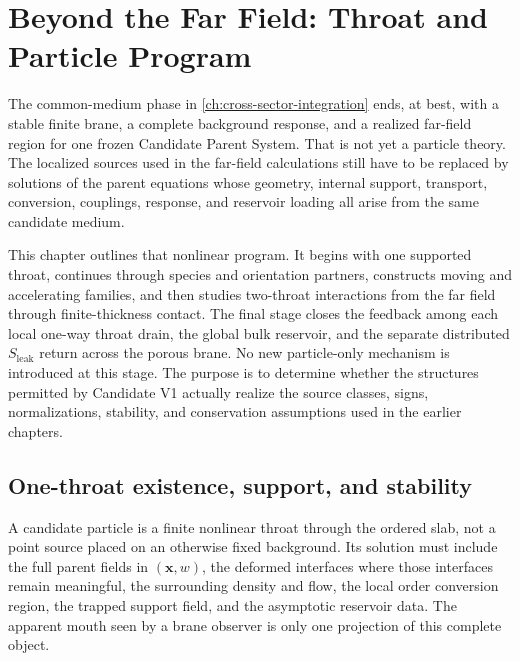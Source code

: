 
\chapter{Beyond the Far Field: Throat and Particle Program}
\label{ch:throat-particle-program}

The common-medium phase in \cref{ch:cross-sector-integration} ends, at best,
with a stable finite brane, a complete background response, and a realized
far-field region for one frozen Candidate Parent System. That is not yet a
particle theory. The localized sources used in the far-field calculations still
have to be replaced by solutions of the parent equations whose geometry,
internal support, transport, conversion, couplings, response, and reservoir
loading all arise from the same candidate medium.

This chapter outlines that nonlinear program. It begins with one supported
throat, continues through species and orientation partners, constructs moving
and accelerating families, and then studies two-throat interactions from the
far field through finite-thickness contact. The final stage closes the feedback
among each local one-way throat drain, the global bulk reservoir, and the
separate distributed \(S_{\mathrm{leak}}\) return across the porous brane. No
new particle-only mechanism is introduced at this stage. The purpose is to
determine whether the structures permitted by Candidate V1 actually realize the
source classes, signs, normalizations, stability, and conservation assumptions
used in the earlier chapters.

\section{One-throat existence, support, and stability}

A candidate particle is a finite nonlinear throat through the ordered slab, not
a point source placed on an otherwise fixed background. Its solution must include
the full parent fields in \((\mathbf x,w)\), the deformed interfaces where those
interfaces remain meaningful, the surrounding density and flow, the local order
conversion region, the trapped support field, and the asymptotic reservoir data.
The apparent mouth seen by a brane observer is only one projection of this
complete object.

